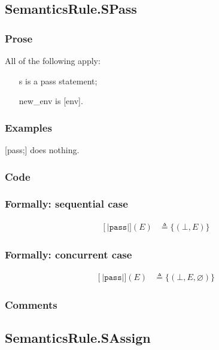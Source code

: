 \documentclass{book}
\newcommand\syntt[1]{\mathtt{#1}}
\newcommand\llbracket{[|}
\newcommand\rrbracket{|]}
\newcommand\interp[1]{\left\llbracket #1 \right\rrbracket}
\begin{document}
\subsection{SemanticsRule.SPass \label{sec:SemanticsRule.SPass}}

  \subsubsection{Prose}
  All of the following apply:
  \begin{itemize}
  \item [s] is a pass statement;
  \item [new\_env] is [env].
  \end{itemize}

  \subsubsection{Examples}
  [pass;] does nothing.

  \subsubsection{Code}

  \subsubsection{Formally: sequential case}
  \begin{align}
  \interp{\syntt{pass}} (E) & \triangleq \{ (\bot, E) \}
  \label{eq:sem-det-spass}
  \end{align} 

  \subsubsection{Formally: concurrent case}
  \begin{align}
  \interp{\syntt{pass}} (E) & \triangleq \{ (\bot, E, \varnothing) \}
  \label{eq:sem-ndet-spass}
  \end{align} 

  \subsubsection{Comments}

\subsection{SemanticsRule.SAssign \label{sec:SemanticsRule.SAssign}}
\end{document}
